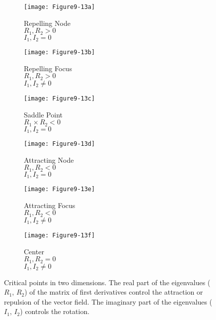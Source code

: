 \begin{figure}[htb]
	\begin{subfigure}[h]{0.32\linewidth}
		\texttt{[image: Figure9-13a]}
		\captionsetup{justification=centering}
		\caption*{Repelling Node\\$R_1, R_2 > 0$\\$I_1, I_2 = 0$}
		\label{fig:Figure9-13a}
	\end{subfigure}
	\hfill
	\begin{subfigure}[h]{0.32\linewidth}
		\texttt{[image: Figure9-13b]}
		\captionsetup{justification=centering}
		\caption*{Repelling Focus\\$R_1, R_2 > 0$\\$I_1, I_2 \neq 0$}
		\label{fig:Figure9-13b}
	\end{subfigure}
	\hfill
	\begin{subfigure}[h]{0.32\linewidth}
		\texttt{[image: Figure9-13c]}
		\captionsetup{justification=centering}
		\caption*{Saddle Point\\$R_1 \times R_2 < 0$\\$I_1, I_2 = 0$}
		\label{fig:Figure9-13c}
	\end{subfigure}
	\hfill
		\begin{subfigure}[h]{0.32\linewidth}
		\texttt{[image: Figure9-13d]}
		\captionsetup{justification=centering}
		\caption*{Attracting Node\\$R_1, R_2 < 0$\\$I_1, I_2 = 0$}
		\label{fig:Figure9-13d}
	\end{subfigure}
	\hfill
	\begin{subfigure}[h]{0.32\linewidth}
		\texttt{[image: Figure9-13e]}
		\captionsetup{justification=centering}
		\caption*{Attracting Focus\\$R_1, R_2 < 0$\\$I_1, I_2 \neq 0$}
		\label{fig:Figure9-13e}
	\end{subfigure}
	\hfill
	\begin{subfigure}[h]{0.32\linewidth}
		\texttt{[image: Figure9-13f]}
		\captionsetup{justification=centering}
		\caption*{Center\\$R_1, R_2 = 0$\\$I_1, I_2 \neq 0$}
		\label{fig:Figure9-13f}
	\end{subfigure}
	\caption{Critical points in two dimensions. The real part of the eigenvalues ($R_1$, $R_2$) of the matrix of first derivatives control the attraction or repulsion of the vector field. The imaginary part of the eigenvalues ($I_1$, $I_2$) controls the rotation.}\label{fig:Figure9-13}
\end{figure}


